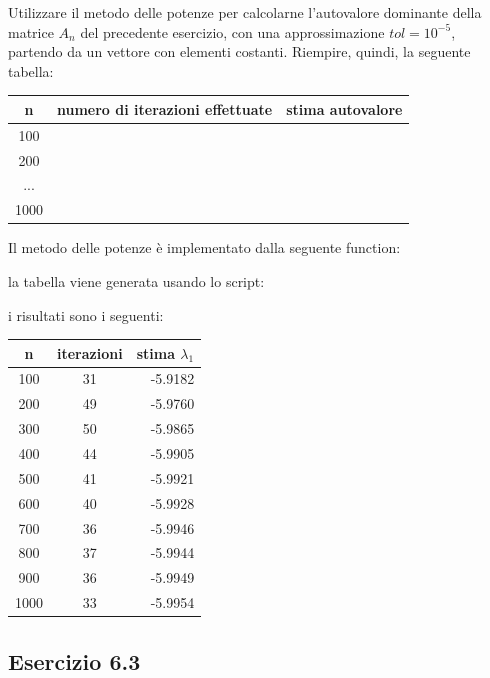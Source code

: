 Utilizzare il metodo delle potenze per calcolarne l’autovalore dominante della matrice $A_n$ del precedente esercizio, con una approssimazione $tol = 10^{-5}$, partendo da un vettore con elementi costanti. Riempire, quindi, la seguente
tabella:
\begin{tabular}{|c|c|c|}
\hline
n & numero di iterazioni effettuate & stima autovalore\\
\hline
100 & & \\
200 & & \\
... & & \\
1000 & & \\
\hline
\end{tabular}
\PP
Il metodo delle potenze è implementato dalla seguente function:

la tabella viene generata usando lo script:

i risultati sono i seguenti:
\begin{tabular}{|c|c|r|}
	\hline
	n & iterazioni & stima $\lambda_1 $\\
	\hline
     	100  &  31  &  -5.9182  \\
     	200  &  49  &  -5.9760  \\
     	300  &  50  &  -5.9865  \\
     	400  &  44  &  -5.9905  \\
     	500  &  41  &  -5.9921  \\
     	600  &  40  &  -5.9928  \\
     	700  &  36  &  -5.9946  \\
     	800  &  37  &  -5.9944  \\
     	900  &  36  &  -5.9949  \\
    	1000  &  33  &  -5.9954  \\
    	\hline
\end{tabular}



	\subsection{Esercizio 6.3}

